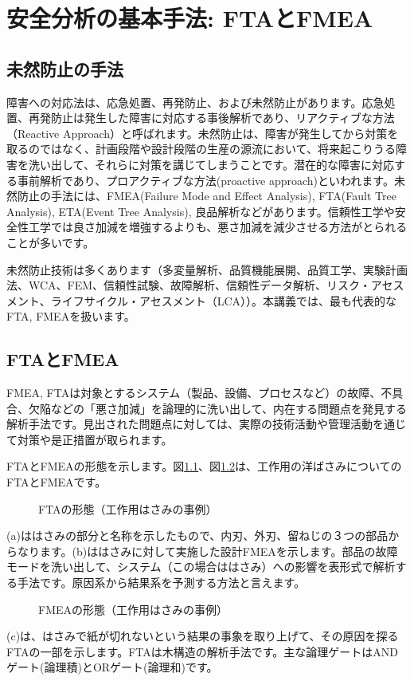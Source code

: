 \chapter{安全分析の基本手法: FTAとFMEA}
\label{chap2}
\section{未然防止の手法}
障害への対応法は、応急処置、再発防止、および未然防止があります。応急処置、再発防止は発生した障害に対応する事後解析であり、リアクティブな方法（Reactive Approach）と呼ばれます。未然防止は、障害が発生してから対策を取るのではなく、計画段階や設計段階の生産の源流において、将来起こりうる障害を洗い出して、それらに対策を講じてしまうことです。潜在的な障害に対応する事前解析であり、プロアクティブな方法(proactive approach)といわれます。未然防止の手法には、FMEA(Failure Mode and Effect Analysis), FTA(Fault Tree Analysis), ETA(Event Tree Analysis), 良品解析などがあります。信頼性工学や安全性工学では良さ加減を増強するよりも、悪さ加減を減少させる方法がとられることが多いです。

未然防止技術は多くあります（多変量解析、品質機能展開、品質工学、実験計画法、WCA、FEM、信頼性試験、故障解析、信頼性データ解析、リスク・アセスメント、ライフサイクル・アセスメント（LCA））。本講義では、最も代表的なFTA, FMEAを扱います。
\section{FTAとFMEA}
 FMEA, FTAは対象とするシステム（製品、設備、プロセスなど）の故障、不具合、欠陥などの「悪さ加減」を論理的に洗い出して、内在する問題点を発見する解析手法です。見出された問題点に対しては、実際の技術活動や管理活動を通じて対策や是正措置が取られます。
 
FTAとFMEAの形態を示します。図\ref{191}、図\ref{192}は、工作用の洋ばさみについてのFTAとFMEAです。
\begin{figure}[htbp]
\begin{center}
\end{center}
\caption{FTAの形態（工作用はさみの事例）}
\label{191}
\end{figure}
(a)ははさみの部分と名称を示したもので、内刃、外刃、留ねじの３つの部品からなります。(b)ははさみに対して実施した設計FMEAを示します。部品の故障モードを洗い出して、システム（この場合ははさみ）への影響を表形式で解析する手法です。原因系から結果系を予測する方法と言えます。
\begin{figure}[htbp]
\begin{center}
\end{center}
\caption{FMEAの形態（工作用はさみの事例）}
\label{192}
\end{figure}
(c)は、はさみで紙が切れないという結果の事象を取り上げて、その原因を探るFTAの一部を示します。FTAは木構造の解析手法です。主な論理ゲートはANDゲート(論理積)とORゲート(論理和)です。

